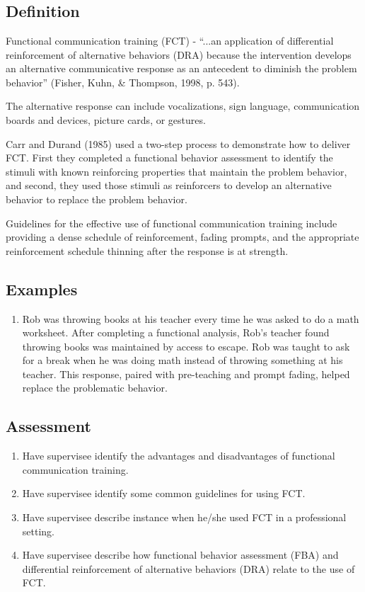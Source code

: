 \section{\fourfSeven{}}
\subsection{Definition}
Functional communication training (FCT) - ``...an application of differential reinforcement of alternative behaviors (DRA) because the intervention develops an alternative communicative response as an antecedent to diminish the problem behavior'' (Fisher, Kuhn, \& Thompson, 1998, p. 543).

The alternative response can include vocalizations, sign language, communication boards and devices, picture cards, or gestures.

Carr and Durand (1985) used a two-step process to demonstrate how to deliver FCT.  First they completed a functional behavior assessment to identify the stimuli with known reinforcing properties that maintain the problem behavior, and second, they used those stimuli as reinforcers to develop an alternative behavior to replace the problem behavior.

Guidelines for the effective use of functional communication training include providing a dense schedule of reinforcement, fading prompts, and the appropriate reinforcement schedule thinning after the response is at strength.
%
\subsection{Examples}
\begin{enumerate}
\item Rob was throwing books at his teacher every time he was asked to do a math worksheet. After completing a functional analysis, Rob's teacher found throwing books was maintained by access to escape. Rob was taught to ask for a break when he was doing math instead of throwing something at his teacher. This response, paired with pre-teaching and prompt fading, helped replace the problematic behavior.
\end{enumerate}
%
\subsection{Assessment}
\begin{enumerate}
\item Have supervisee identify the advantages and disadvantages of functional communication training.
\item Have supervisee identify some common guidelines for using FCT.
\item Have supervisee describe instance when he/she used FCT in a professional setting.
\item Have supervisee describe how functional behavior assessment (FBA) and differential reinforcement of alternative behaviors (DRA) relate to the use of FCT.
%
\end{enumerate}
%
